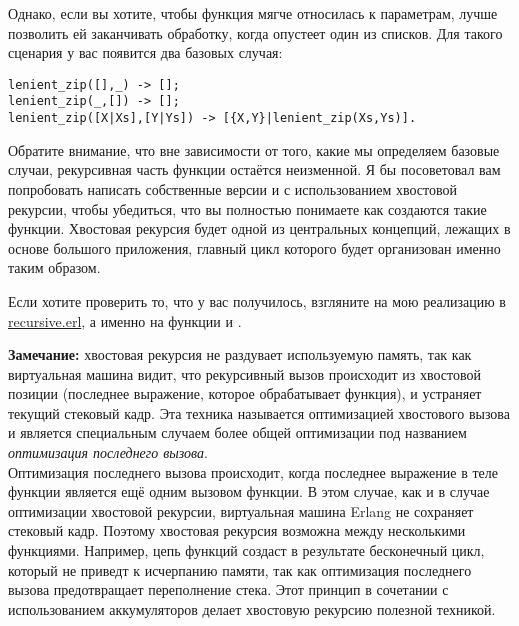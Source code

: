 Однако, если вы хотите, чтобы функция мягче относилась к параметрам, лучше позволить ей заканчивать обработку, когда опустеет один из списков. Для такого сценария у вас появится два базовых случая:
\begin{lstlisting}[style=erlang]
lenient_zip([],_) -> [];
lenient_zip(_,[]) -> [];
lenient_zip([X|Xs],[Y|Ys]) -> [{X,Y}|lenient_zip(Xs,Ys)].
\end{lstlisting}

Обратите внимание, что вне зависимости от того, какие мы определяем базовые случаи, рекурсивная часть функции остаётся неизменной. Я бы посоветовал вам попробовать написать собственные версии  и  с использованием хвостовой рекурсии, чтобы убедиться, что вы полностью понимаете как создаются такие функции. Хвостовая рекурсия будет одной из центральных концепций, лежащих в основе большого приложения, главный цикл которого будет организован именно таким образом.

Если хотите проверить то, что у вас получилось, взгляните на мою реализацию в \href{http://learnyousomeerlang.com/static/erlang/recursive.erl}{recursive.erl}, а именно на функции  и .
\colorbox{lgray}
{
    \begin{minipage}{\linewidth}
\textbf{Замечание:} хвостовая рекурсия не раздувает используемую память, так как виртуальная машина видит, что рекурсивный вызов происходит из хвостовой позиции (последнее выражение, которое обрабатывает функция), и устраняет текущий стековый кадр. Эта техника называется оптимизацией хвостового вызова и является специальным случаем более общей оптимизации под названием \emph{оптимизация последнего вызова}.\\
Оптимизация последнего вызова происходит, когда последнее выражение в теле функции является ещё одним вызовом функции. В этом случае, как и в случае оптимизации хвостовой рекурсии, виртуальная машина Erlang не сохраняет стековый кадр. Поэтому хвостовая рекурсия возможна между несколькими функциями. Например, цепь функций  создаст в результате бесконечный цикл, который не приведт к исчерпанию памяти, так как оптимизация последнего вызова предотвращает переполнение стека. Этот принцип в сочетании с использованием аккумуляторов делает хвостовую рекурсию полезной техникой.
    \end{minipage}
}
